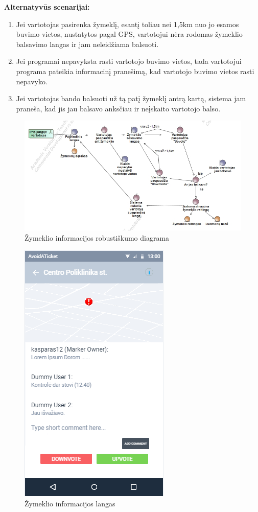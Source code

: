 \documentclass{VUMIFPSkursinis}
\begin{document}
	\textbf{Alternatyvūs scenarijai:}
	\begin{enumerate}[itemsep=-2mm]
		\item Jei vartotojas pasirenka žymeklį, esantį toliau nei 1,5km nuo jo esamos buvimo vietos, nustatytos pagal GPS, vartotojui nėra rodomas žymeklio balsavimo langas ir jam neleidžiama balsuoti.
		\item Jei programai nepavyksta rasti vartotojo buvimo vietos, tada vartotojui programa pateikia informacinį pranešimą, kad vartotojo buvimo vietos rasti nepavyko.
		\item Jei vartotojas bando balsuoti už tą patį žymeklį antrą kartą, sistema jam praneša, kad jis jau balsavo anksčiau ir neįskaito vartotojo balso.
	\end{enumerate} 
		\begin{figure}[H]
				\centering
				\includegraphics[scale=0.6]{img/vartotoju_balsavimas_del_zymeklio_teisingumo}
				\caption{Žymeklio informacijos robustiškumo diagrama}
				\label{img:Žymeklio informacijos RD}
			\end{figure}
	\begin{figure}[H]
				\centering
				\includegraphics[scale=0.6]{img/mockup_markerInfoWindow}
				\caption{Žymeklio informacijos langas}
				\label{img:Žymeklio informacijos langas}
			\end{figure}
\end{document}
